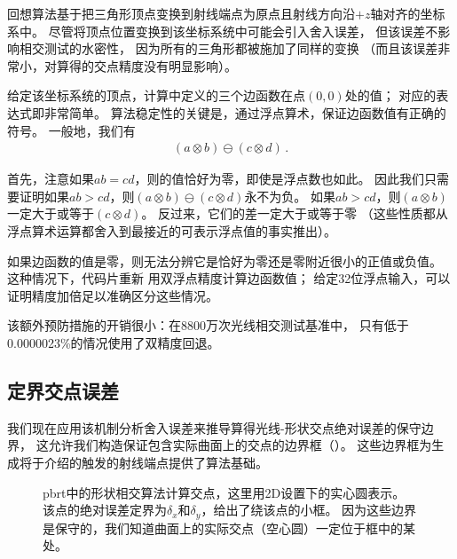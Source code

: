 回想算法基于把三角形顶点变换到射线端点为原点且射线方向沿$+z$轴对齐的坐标系中。
尽管将顶点位置变换到该坐标系统中可能会引入舍入误差，
但该误差不影响相交测试的水密性，
因为所有的三角形都被施加了同样的变换
（而且该误差非常小，对算得的交点精度没有明显影响）。

给定该坐标系统的顶点，计算中定义的三个边函数在点$(0,0)$处的值；
对应的表达式即非常简单。
算法稳定性的关键是，通过浮点算术，保证边函数值有正确的符号。
一般地，我们有
\begin{align}\label{eq:3.12}
    (a\otimes b)\ominus(c\otimes d)\, .
\end{align}

首先，注意如果$ab=cd$，则的值恰好为零，即使是浮点数也如此。
因此我们只需要证明如果$ab>cd$，则$(a\otimes b)\ominus(c\otimes d)$永不为负。
如果$ab>cd$，则$(a\otimes b)$一定大于或等于$(c\otimes d)$。
反过来，它们的差一定大于或等于零
（这些性质都从浮点算术运算都舍入到最接近的可表示浮点值的事实推出）。

如果边函数的值是零，则无法分辨它是恰好为零还是零附近很小的正值或负值。
这种情况下，代码片重新
用双浮点精度计算边函数值；
给定32位浮点输入，可以证明精度加倍足以准确区分这些情况。

该额外预防措施的开销很小：在8800万次光线相交测试基准中，
只有低于0.0000023\%的情况使用了双精度回退。

\subsection{定界交点误差}\label{sub:定界交点误差}
我们现在应用该机制分析舍入误差来推导算得光线-形状交点绝对误差的保守边界，
这允许我们构造保证包含实际曲面上的交点的边界框（）。
这些边界框为生成将于介绍的触发的射线端点提供了算法基础。
\begin{figure}[htbp]
    \centering
    \caption{pbrt中的形状相交算法计算交点，这里用2D设置下的实心圆表示。
        该点的绝对误差定界为$\delta_x$和$\delta_y$，给出了绕该点的小框。
        因为这些边界是保守的，我们知道曲面上的实际交点（空心圆）一定位于框中的某处。}
    \label{fig:3.43}
\end{figure}

